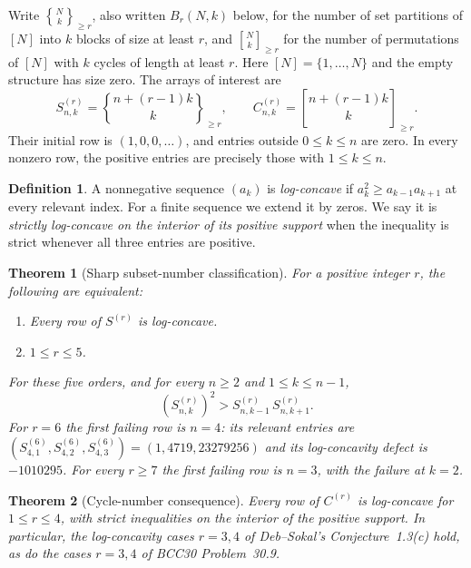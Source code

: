 \documentclass[11pt,a4paper]{article}
\numberwithin{equation}{section}
\newtheorem{theorem}{Theorem}[section]
\theoremstyle{definition}
\newtheorem{definition}[definition]{Definition}
\theoremstyle{remark}
\newcommand{\Snum}[3]{S^{(#1)}_{#2,#3}}
\newcommand{\Cnum}[3]{C^{(#1)}_{#2,#3}}
\newcommand{\assocS}[3]{\genfrac\{\}{0pt}{}{#1}{#2}_{\!\ge #3}}
\newcommand{\assocC}[3]{\genfrac[]{0pt}{}{#1}{#2}_{\!\ge #3}}
\begin{document}
Write $\assocS{N}{k}{r}$, also written $B_r(N,k)$ below, for the number of
set partitions of $[N]$ into $k$ blocks of size at least $r$, and
$\assocC{N}{k}{r}$ for the number of permutations of $[N]$ with $k$ cycles
of length at least $r$. Here $[N]=\{1,\ldots,N\}$ and the empty structure
has size zero. The arrays of interest are
\begin{equation}\label{eq:definitions}
 \Snum r n k=\assocS{n+(r-1)k}{k}{r},\qquad
 \Cnum r n k=\assocC{n+(r-1)k}{k}{r}.
\end{equation}
Their initial row is $(1,0,0,\ldots)$, and entries outside $0\le k\le n$
are zero. In every nonzero row, the positive entries are precisely those
with $1\le k\le n$.

\begin{definition}
A nonnegative sequence $(a_k)$ is \emph{log-concave} if
$a_k^2\ge a_{k-1}a_{k+1}$ at every relevant index. For a finite sequence
we extend it by zeros. We say it is \emph{strictly log-concave on the
interior of its positive support} when the inequality is strict whenever
all three entries are positive.
\end{definition}

\begin{theorem}[Sharp subset-number classification]\label{thm:main}
For a positive integer $r$, the following are equivalent:
\begin{enumerate}[label=(\roman*),nosep]
\item Every row of $S^{(r)}$ is log-concave.
\item $1\le r\le5$.
\end{enumerate}
For these five orders, and for every $n\ge2$ and $1\le k\le n-1$,
\begin{equation}\label{eq:main-strict}
 (\Snum r n k)^2>\Snum r n {k-1}\,\Snum r n {k+1}.
\end{equation}
For $r=6$ the first failing row is $n=4$: its relevant entries are
$(\Snum6 4 1,\Snum6 4 2,\Snum6 4 3)=(1,4719,23279256)$ and its
log-concavity defect is $-1010295$. For every $r\ge7$ the first failing
row is $n=3$, with the failure at $k=2$.
\end{theorem}

\begin{theorem}[Cycle-number consequence]\label{thm:cycles}
Every row of $C^{(r)}$ is log-concave for $1\le r\le4$, with strict
inequalities on the interior of the positive support. In particular,
the log-concavity cases $r=3,4$ of Deb--Sokal's Conjecture~1.3(c) hold,
as do the cases $r=3,4$ of BCC30 Problem~30.9.
\end{theorem}
\end{document}
